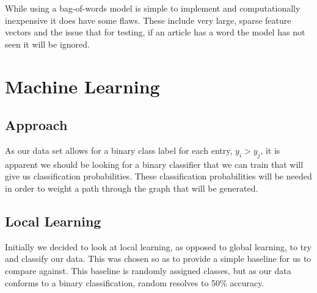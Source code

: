\documentclass[12pt]{report}
\begin{document}
                While using a bag-of-words model is simple to implement and computationally inexpensive
                it does have some flaws. These include very large, sparse feature vectors and the issue
                that for testing, if an article has a word the model has not seen it will be ignored.
                  
                
                

\chapter{Machine Learning}

\section{Approach}
As our data set allows for a binary class label for each entry,
$y_{i} > y_{j}$, it is apparent we should be looking for a binary classifier that we can train
that will give us classification probabilities. These classification probabilities
will be needed in order to weight a path through the graph that will be generated.
\section{Local Learning}
Initially we decided to look at local learning, as opposed to global learning,
to try and classify our data. This was chosen so as to provide a
simple baseline for us to compare against. This baseline is
randomly assigned classes, but as our data conforms to a
binary classification, random resolves to 50\% accuracy.
\end{document}
